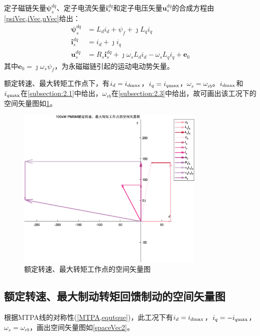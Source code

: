 \documentclass[UTF8]{ctexart}
\numberwithin{figure}{section}
\numberwithin{table}{section}
\begin{document}
定子磁链矢量$\boldsymbol{\psi}_s^{dq}$、定子电流矢量$\boldsymbol{i}_s^{dq}$和定子电压矢量$\boldsymbol{u}_s^{dq}$的合成方程由\cref{psiVec,iVec,uVec}\cite{b}给出：
\begin{align}
	\boldsymbol{\psi}_s^{dq} & =L_d i_d+\psi_f+\jmath L_q i_q \label{psiVec}                                                \\
	\boldsymbol{i}_s^{dq}    & =i_d+\jmath i_q \label{iVec}                                                                 \\
	\boldsymbol{u}_s^{dq}    & =R_s\boldsymbol{i}_s^{dq}+\jmath\omega_sL_d i_d-\omega_sL_qi_q+\boldsymbol{e}_0 \label{uVec}
\end{align}
其中$\boldsymbol{e}_0=\jmath\omega_s\psi_f$，为永磁磁链引起的运动电动势矢量。

额定转速、最大转矩工作点下，有$i_d=i_{d\rm max}$，$i_q=i_{q\rm max}$，$\omega_s=\omega_{rb}$。$i_{d\rm max}$和$i_{q\rm max}$在\cref{subsection:2.1}中给出，$\omega_{rb}$在\cref{subsection:2.3}中给出，故可画出该工况下的空间矢量图如\cref{spaceVec1}。

\begin{figure}[htbp]
	\centering
	\includegraphics[width=0.8\textwidth]{7}
	\caption{额定转速、最大转矩工作点的空间矢量图}
	\label{spaceVec1}
\end{figure}

\subsection{额定转速、最大制动转矩回馈制动的空间矢量图}
\label{subsection:2.8}

根据MTPA线的对称性(\cref{MTPA,equtque})，此工况下有$i_d=i_{d\rm max}$，$i_q=-i_{q\rm max}$，$\omega_s=\omega_{rb}$，画出空间矢量图如\cref{spaceVec2}。
\end{document}

